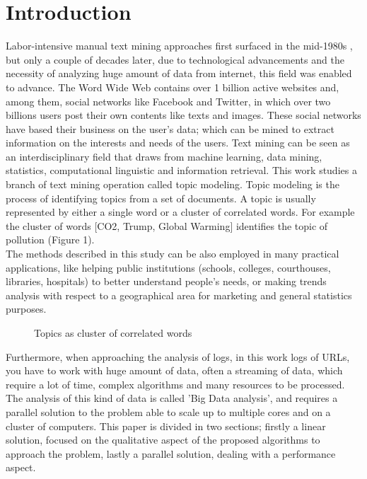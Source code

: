 \section{Introduction}
Labor-intensive manual text mining approaches first surfaced in the mid-1980s \cite{cav}, but only a couple of decades later, due to technological advancements and the necessity of analyzing huge amount of data from internet, this field was enabled to advance. The Word Wide Web contains over 1 billion active websites \cite{ils} and, among them, social networks like Facebook and Twitter, in which over two billions users post their own contents like texts and images. These social networks have based their business on the user's data; which can be mined to extract information on the interests and needs of the users. Text mining can be seen as an interdisciplinary field that draws from machine learning, data mining, statistics, computational linguistic and information retrieval. This work studies a branch of text mining operation called topic modeling. Topic modeling is the process of identifying topics from a set of documents. A topic is usually represented by either a single word or a cluster of correlated words. For example the cluster of words [CO2, Trump, Global Warming] identifies the topic of pollution (Figure 1).\\ 
The methods described in this study can be also employed in many practical applications, like helping public institutions (schools, colleges, courthouses, libraries, hospitals) to better understand people's needs, or making trends analysis with respect to a geographical area for marketing and general statistics purposes.\\

	
	\begin{figure}[h]
	\caption{Topics as cluster of correlated words}
	\end{figure}
	
	Furthermore, when approaching the analysis of logs, in this work logs of URLs, you have to work with huge amount of data, often a streaming of data, which require a lot of time, complex algorithms and many resources to be processed. The analysis of this kind of data is called 'Big Data analysis', and requires a parallel solution to the problem able to scale up to multiple cores and on a cluster of computers. This paper is divided in two sections; firstly a linear solution, focused on the qualitative aspect of the proposed algorithms to approach the problem, lastly a parallel solution, dealing with a performance aspect.

